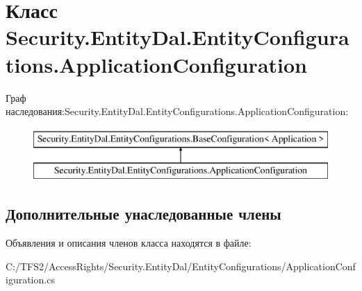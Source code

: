 \hypertarget{class_security_1_1_entity_dal_1_1_entity_configurations_1_1_application_configuration}{}\section{Класс Security.\+Entity\+Dal.\+Entity\+Configurations.\+Application\+Configuration}
\label{class_security_1_1_entity_dal_1_1_entity_configurations_1_1_application_configuration}
Граф наследования\+:Security.\+Entity\+Dal.\+Entity\+Configurations.\+Application\+Configuration\+:\begin{figure}[H]
\begin{center}
\leavevmode
\includegraphics[height=2.000000cm]{dc/da1/class_security_1_1_entity_dal_1_1_entity_configurations_1_1_application_configuration}
\end{center}
\end{figure}
\subsection*{Дополнительные унаследованные члены}


Объявления и описания членов класса находятся в файле\+:\begin{DoxyCompactItemize}
\item 
C\+:/\+T\+F\+S2/\+Access\+Rights/\+Security.\+Entity\+Dal/\+Entity\+Configurations/Application\+Configuration.\+cs\end{DoxyCompactItemize}
